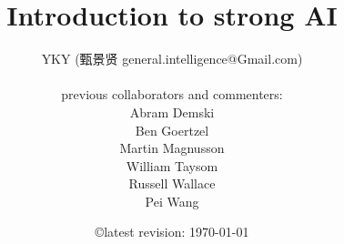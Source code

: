 \documentclass[12pt,a4paper]{report}
\title{\textbf{Introduction to strong AI}}
\author{YKY (甄景贤 general.intelligence@Gmail.com)\\ \\
previous collaborators and commenters:\\
Abram Demski\\
Ben Goertzel\\
Martin Magnusson\\
William Taysom\\
Russell Wallace\\
Pei Wang
}
\date{\copyright \quad latest revision: \today}
\newcommand{\cc}[2]{#1}
\newcommand{\cc}[2]{#2}
\theoremstyle{examples} \newtheorem{example}{Example}[section]
\begin{document}


\maketitle
\dominitoc

\end{document}
